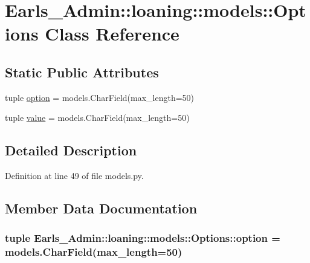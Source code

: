 \hypertarget{classEarls__Admin_1_1loaning_1_1models_1_1Options}{
\section{Earls\_\-Admin::loaning::models::Options Class Reference}
\label{classEarls__Admin_1_1loaning_1_1models_1_1Options}
}
\subsection*{Static Public Attributes}
\begin{CompactItemize}
\item 
tuple \hyperlink{classEarls__Admin_1_1loaning_1_1models_1_1Options_c618ff18bc1f7373645af59cad8881e6}{option} = models.CharField(max\_\-length=50)
\item 
tuple \hyperlink{classEarls__Admin_1_1loaning_1_1models_1_1Options_43efaedbb98677892753102256335432}{value} = models.CharField(max\_\-length=50)
\end{CompactItemize}


\subsection{Detailed Description}


Definition at line 49 of file models.py.

\subsection{Member Data Documentation}
\hypertarget{classEarls__Admin_1_1loaning_1_1models_1_1Options_c618ff18bc1f7373645af59cad8881e6}{
\subsubsection[option]{\setlength{\rightskip}{0pt plus 5cm}tuple {\bf Earls\_\-Admin::loaning::models::Options::option} = models.CharField(max\_\-length=50)}}
\label{classEarls__Admin_1_1loaning_1_1models_1_1Options_c618ff18bc1f7373645af59cad8881e6}




